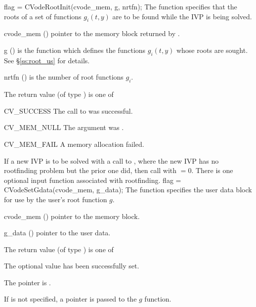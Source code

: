 {
  flag = CVodeRootInit(cvode\_mem, g, nrtfn);
}
{
  The function  specifies that the roots of a set of
  functions $g_i(t,y)$ are to be found while the IVP is being solved.
}
{
  \begin{args}
  \item[cvode\_mem] ()
    pointer to the {\cvode} memory block returned by .
  \item[g] ()
    is the {\C} function which defines the  functions $g_i(t,y)$
    whose roots are sought. See \S\ref{ss:root_us} for details.
  \item[nrtfn] ()
    is the number of root functions $g_i$.
  \end{args}
}
{
  The return value  (of type ) is one of
  \begin{args}
  \item[CV\_SUCCESS]
    The call to  was successful.
  \item[CV\_MEM\_NULL]
    The  argument was .
  \item[CV\_MEM\_FAIL]
    A memory allocation failed.
  \end{args}
}
{
  If a new IVP is to be solved with a call to , where the new
  IVP has no rootfinding problem but the prior one did, then call
   with $=0$.
}
There is one optional input function associated with rootfinding. 
{
  flag = CVodeSetGdata(cvode\_mem, g\_data);
}
{
  The function  specifies the user data block 
  for use by the user's root function $g$.
}
{
  \begin{args}
  \item[cvode\_mem] ()
    pointer to the {\cvode} memory block.
  \item[g\_data] ()
    pointer to the user data.
  \end{args}
}
{
  The return value  (of type ) is one of
  \begin{args}
  \item[\Id{CV\_SUCCESS}] 
    The optional value has been successfully set.
  \item[\Id{CV\_MEM\_NULL}]
    The  pointer is .
  \end{args}
}
{
  If  is not specified, a  pointer is
  passed to the $g$ function.
}
